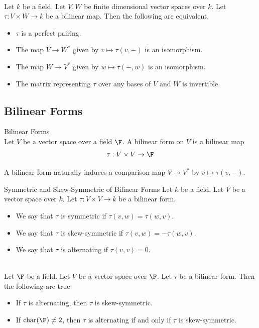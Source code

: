 \documentclass[a4paper]{article}
\begin{document}
\begin{prp}{}{}\\
Let $k$ be a field. Let $V,W$ be finite dimensional vector spaces over $k$. Let $\tau:V\times W\to k$ be a bilinear map. Then the following are equivalent. 
\begin{itemize}
\item $\tau$ is a perfect pairing. 
\item The map $V\to W^\ast$ given by $v\mapsto\tau(v,-)$ is an isomorphism. 
\item The map $W\to V^\ast$ given by $w\mapsto\tau(-,w)$ is an isomorphism. 
\item The matrix representing $\tau$ over any bases of $V$ and $W$ is invertible. 
\end{itemize}
\end{prp}

\subsection{Bilinear Forms}
\begin{defn}{Bilinear Forms}{}\\
Let $V$ be a vector space over a field $\F$. A bilinear form on $V$ is a bilinear map $$\tau:V\times V\to\F$$
\end{defn}

A bilinear form naturally induces a comparison map $V\to V^\ast$ by $v\mapsto\tau(v,-)$. 

\begin{defn}{Symmetric and Skew-Symmetric of Bilinear Forms}{} Let $k$ be a field. Let $V$ be a vector space over $k$. Let $\tau:V\times V\to k$ be a bilinear form. 
\begin{itemize}
\item We say that $\tau$ is symmetric if $\tau(v,w)=\tau(w,v)$. 
\item We say that $\tau$ is skew-symmetric if $\tau(v,w)=-\tau(w,v)$. 
\item We say that $\tau$ is alternating if $\tau(v,v)=0$. 
\end{itemize}
\end{defn}

\begin{lmm}{}{}\\
Let $\F$ be a field. Let $V$ be a vector space over $\F$. Let $\tau$ be a bilinear form. Then the following are true. 
\begin{itemize}
\item If $\tau$ is alternating, then $\tau$ is skew-symmetric. 
\item If $\text{char}(\F)\neq 2$, then $\tau$ is alternating if and only if $\tau$ is skew-symmetric. 
\end{itemize}
\end{lmm}
\end{document}
